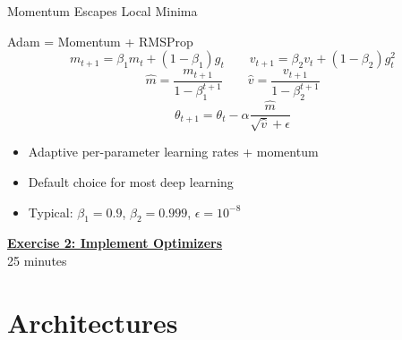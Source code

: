 \documentclass[aspectratio=169]{beamer}
\begin{document}
\begin{frame}{Momentum Escapes Local Minima}
\begin{center}
\end{center}
\end{frame}

\begin{frame}{Adam = Momentum + RMSProp \cite{kingma2014}}
$$m_{t+1} = \beta_1 m_t + (1-\beta_1) g_t \qquad v_{t+1} = \beta_2 v_t + (1-\beta_2) g_t^2$$
$$\hat{m} = \frac{m_{t+1}}{1-\beta_1^{t+1}} \qquad \hat{v} = \frac{v_{t+1}}{1-\beta_2^{t+1}}$$
$$\theta_{t+1} = \theta_t - \alpha \frac{\hat{m}}{\sqrt{\hat{v}} + \epsilon}$$
\begin{itemize}
\item Adaptive per-parameter learning rates + momentum
\item Default choice for most deep learning
\item Typical: $\beta_1=0.9$, $\beta_2=0.999$, $\epsilon=10^{-8}$
\end{itemize}
\end{frame}

\begin{frame}{}
\centering
\Large \href{https://colab.research.google.com/github/wusche1/Illiad_ML_Engineering/blob/main/lectures/01_a_ml_foundations/exercises/02_optimizers/notebook.ipynb}{\textbf{Exercise 2: Implement Optimizers}} \\[1em]
\normalsize 25 minutes \\[1em]
\end{frame}

\section{Architectures}
\end{document}
